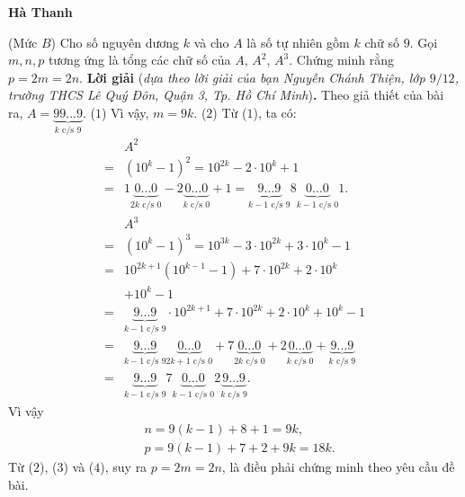\begin{multicols}{2}
\begin{flushright}
		\textbf{\color{thachthuctoanhoc}Hà Thanh}
	\end{flushright}
	{}
	(Mức $B$) Cho số nguyên dương $k$ và cho $A$ là số tự nhiên gồm $k$ chữ số $9$. Gọi $m, n, p$ tương ứng là tổng các chữ số của $A$, $A^2$, $A^3$. Chứng minh rằng $p = 2m = 2n$.
	\vskip 0.05cm
	\textbf{\color{thachthuctoanhoc}Lời giải} (\textit{dựa theo lời giải của bạn Nguyễn Chánh Thiện, lớp $9/12$, trường THCS Lê Quý Đôn, Quận 3, Tp. Hồ Chí Minh})\textbf{\color{thachthuctoanhoc}.}
	\vskip 0.05cm
	Theo giả thiết của bài ra, $A = \underbrace {99 \ldots 9}_{k{\text{ c/s }}9}.$ \hfill ($1$)
	\vskip 0.05cm
	Vì vậy, $m = 9k$. \hfill ($2$)
	\vskip 0.05cm
	Từ ($1$), ta có:
	\begin{align*}
			&{A^2} \\
			=& {\left( {{{10}^k} - 1} \right)^2} = {10^{2k}} - 2 \cdot {10^k} + 1 \\
			= &1\underbrace {0 \ldots 0}_{2k{\text{ c/s }}0} - 2\underbrace {0 \ldots 0}_{k {\text{ c/s }} 0} + 1 = \underbrace {9 \ldots 9}_{k - 1{\text{ c/s }}9}8\underbrace {0 \ldots 0}_{k - 1{\text{ c/s }}0}1.\\
				&{A^3} \\
				=& {\left( {{{10}^k} - 1} \right)^3} = {10^{3k}} - 3 \cdot {10^{2k}} + 3 \cdot {10^k} - 1\\
				 =& {10^{2k + 1}}\left( {{{10}^{k - 1}} - 1} \right) + 7 \cdot {10^{2k}} + 2 \cdot {10^k} \\
				 &+ {10^k} - 1\\
				 =& \underbrace {9 \ldots 9}_{k - 1{\text{ c/s }}9} \cdot {10^{2k + 1}} + 7 \cdot {10^{2k}} + 2 \cdot {10^k} + {10^k} - 1\\
				 =& \underbrace {9 \ldots 9}_{k - 1{\text{ c/s }}9}\underbrace {0 \ldots 0}_{2k + 1{\text{ c/s }}0} + 7\underbrace {0 \ldots 0}_{2k{\text{ c/s }}0} + 2\underbrace {0 \ldots 0}_{k{\text{ c/s }}0} + \underbrace {9 \ldots 9}_{k{\text{ c/s }}9}\\
				 =&\underbrace {9 \ldots 9}_{k - 1{\text{ c/s }}9}7\underbrace {0 \ldots 0}_{k - 1{\text{ c/s }}0}2\underbrace {9 \ldots 9}_{k{\text{ c/s }}9}.
	\end{align*}
	Vì vậy
	\begin{align*}
		&n = 9(k - 1) + 8 + 1 = 9k, \tag{$3$}\\
		&p = 9(k - 1) + 7 + 2 + 9k = 18k. \tag{$4$}
	\end{align*}
	Từ ($2$), ($3$) và ($4$), suy ra $p = 2m = 2n$, là điều phải chứng minh theo yêu cầu đề bài.
	\vskip 0.05cm

\end{multicols}
